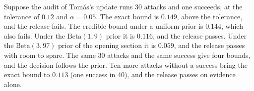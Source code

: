 \begin{example}\label{c22:ex-thirty}
Suppose the audit of Tom\'as's update runs 30 attacks and one succeeds, at the tolerance of $0.12$
and $\alpha=0.05$. The exact bound is $0.149$, above the tolerance, and the release fails. The credible
bound under a uniform prior is $0.144$, which also fails. Under the $\mathrm{Beta}(1,9)$ prior it is $0.116$, and
the release passes. Under the $\mathrm{Beta}(3,97)$ prior of the opening section it is $0.059$, and the release
passes with room to spare. The same 30 attacks and the same success give four bounds, and the
decision follows the prior. Ten more attacks without a success bring the exact bound to $0.113$ (one success in 40), and
the release passes on evidence alone.
\end{example}

